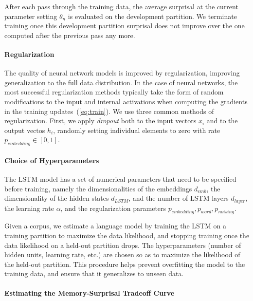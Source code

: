 \documentclass[11pt,letterpaper]{article}
\begin{document}
After each pass through the training data, the average surprisal at the current parameter setting $\theta_n$ is evaluated on the development partition.
We terminate training once this development partition surprisal does not improve over the one computed after the previous pass any more.

\paragraph{Regularization}
The quality of neural network models is improved by regularization, improving generalization to the full data distribution.
In the case of neural networks, the most successful regularization methods typically take the form of random modifications to the input and internal activations when computing the gradients in the training updates~(\ref{eq:train}).
We use three common methods of regularization.
First, we apply \emph{dropout} both to the input vectors $x_i$ and to the output vectos $h_i$, randomly setting individual elements to zero with rate $p_{embedding} \in [0,1]$.


\paragraph{Choice of Hyperparameters}

The LSTM model has a set of numerical parameters that need to be specified before training, namely the dimensionalities of the embeddings $d_{emb}$, the dimensionality of the hidden states $d_{LSTM}$, and the number of LSTM layers $d_{layer}$, the learning rate $\alpha$, and the regularization parameters $p_{embedding}, p_{word}, p_{noising}$.


Given a corpus, we estimate a language model by training the LSTM on a training partition to maximize the data likelihood, and stopping training once the data likelihood on a held-out partition drops.
The hyperparameters (number of hidden units, learning rate, etc.) are chosen so as to maximize the likelihood of the held-out partition.
This procedure helps prevent overfitting the model to the training data, and ensure that it generalizes to unseen data. 



\paragraph{Estimating the Memory-Surprisal Tradeoff Curve}
\end{document}
